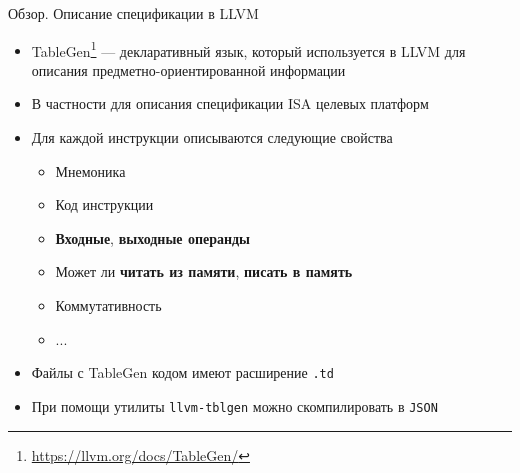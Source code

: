 \documentclass
  [ russian
  , aspectratio=169 %
  ] {beamer}
\begin{document}
\begin{frame}[fragile]{Обзор. Описание спецификации в LLVM}

    \begin{itemize}
        \item TableGen\footnote[frame]{\url{https://llvm.org/docs/TableGen/}} --- декларативный язык, который используется в LLVM для описания предметно-ориентированной информации
        \item В частности для описания спецификации ISA целевых платформ
        \item Для каждой инструкции описываются следующие свойства
              \begin{itemize}
                  \item Мнемоника
                  \item Код инструкции
                  \item \textbf{Входные}, \textbf{выходные операнды}
                  \item Может ли \textbf{читать из памяти}, \textbf{писать в память}
                  \item Коммутативность
                  \item ...
              \end{itemize}
        \item Файлы с TableGen кодом имеют расширение \texttt{.td}
        \item При помощи утилиты \texttt{llvm-tblgen} можно скомпилировать в \texttt{JSON}
    \end{itemize}


\end{frame}
\end{document}
